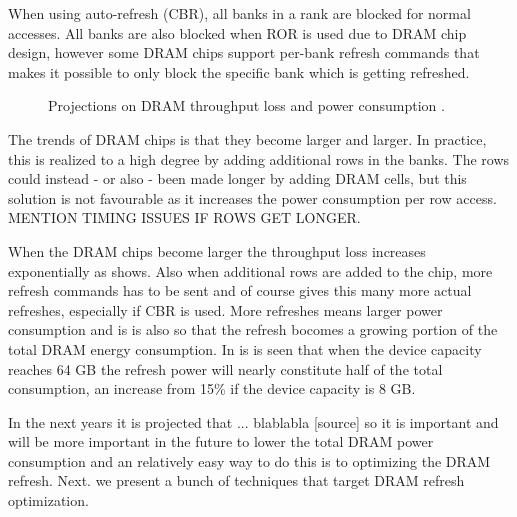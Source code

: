 When using auto-refresh (CBR), all banks in a rank are blocked for normal accesses. All banks are also blocked when ROR is used due to DRAM chip design, however some DRAM chips support per-bank refresh commands that makes it possible to only block the specific bank which is getting refreshed. 

\begin{figure}[t]
    \centering
    \caption{Projections on DRAM throughput loss and power consumption \cite{raidr}.}
    \label{fig:dram_data_proj}
\end{figure}


The trends of DRAM chips is that they become larger and larger. In practice, this is realized to a high degree by adding additional rows in the banks. The rows could instead - or also - been made longer by adding DRAM cells, but this solution is not favourable as it increases the power consumption per row access. MENTION TIMING ISSUES IF ROWS GET LONGER.

When the DRAM chips become larger the throughput loss increases exponentially as  shows. Also when additional rows are added to the chip, more refresh commands has to be sent and of course gives this many more actual refreshes, especially if CBR is used. More refreshes means larger power consumption and is is also so that the refresh bocomes a growing portion of the total DRAM energy consumption. In  is is seen that when the device capacity reaches 64 GB the refresh power will nearly constitute half of the total consumption, an increase from 15\% if the device capacity is 8 GB. 

In the next years it is projected that ... blablabla [source] so it is important and will be more important in the future to lower the total DRAM power consumption and an relatively easy way to do this is to optimizing the DRAM refresh. Next. we present a bunch of techniques that target DRAM refresh optimization.

